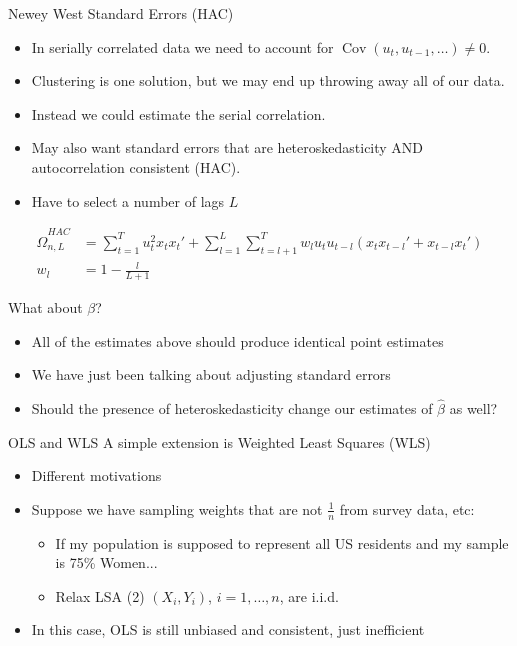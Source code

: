 \documentclass[aspectratio=169]{beamer}
\begin{document}
\begin{frame}{Newey West Standard Errors (HAC)}
\begin{itemize}
\item In serially correlated data we need to account for $\operatorname{ Cov } (u_{t},u_{t-1},\ldots ) \neq 0$.
\item Clustering is one solution, but we may end up throwing away all of our data.
\item Instead we could estimate the serial correlation.
\item May also want standard errors that are \alert{heteroskedasticity AND autocorrelation consistent} (HAC).
\item Have to select a number of lags $L$
\end{itemize}
\begin{align*}
\widehat { \Omega } _ { n,L }^{HAC} &= \sum _ { t = 1 } ^ { T }  u _ { t }^2 x_t x_t'  + \sum_{l=1}^L \sum _ { t = l+1 } ^ { T } w_l u_t u _ { t-l } \left( x_t x_{t-l}' +  x_{t-l} x_{t}'  \right)\\
w_l &= 1 - \frac{l}{L+1}
\end{align*}
\end{frame}




\begin{frame}{What about $\beta$?}
\begin{itemize}
\item All of the estimates above should produce \alert{identical} point estimates
\item We have just been talking about adjusting \alert{standard errors}
\item Should the presence of heteroskedasticity change our estimates of $\widehat{\beta}$ as well?
\end{itemize}
\end{frame}



\begin{frame}{OLS and WLS}
A simple extension is Weighted Least Squares (WLS)
\begin{itemize}
\item Different motivations
\item Suppose we have sampling weights that are not $\frac{1}{n}$ from survey data, etc:
    \begin{itemize}
    \item If my population is supposed to represent all US residents and my sample is 75\% Women...
    \item Relax LSA (2) $(X_i,Y_i)$, $i =1,\ldots,n$, are i.i.d.
\end{itemize}
\item In this case, OLS is still unbiased and consistent, just \alert{inefficient}
\end{itemize}
\end{frame}
\end{document}
